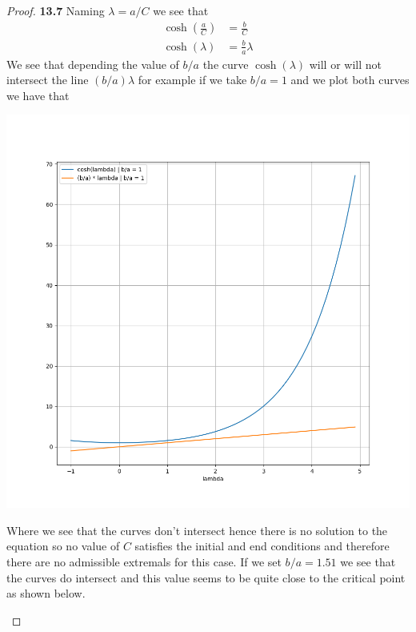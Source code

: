 \documentclass[11pt]{article}
\theoremstyle{definition}
\begin{document}
\begin{proof}{\textbf{13.7}}
    Naming $\lambda = a/C$ we see that
    \begin{align*}
        \cosh\left(\frac{a}{C}\right) &= \frac{b}{C}\\
        \cosh(\lambda) &= \frac{b}{a} \lambda
    \end{align*}
    We see that depending the value of $b/a$ the curve $\cosh(\lambda)$ will or
    will not intersect the line $(b/a) \lambda$ for example if we take
    $b/a = 1$ and we plot both curves we have that
    \begin{center}
        \includegraphics[scale=0.4]{ch13-7_1.png}
    \end{center}
    Where we see that the curves don't intersect hence there is no solution
    to the equation so no value of $C$ satisfies the initial and
    end conditions and therefore there are no admissible extremals
    for this case.
    If we set $b/a = 1.51$ we see that the curves do intersect and this value
    seems to be quite close to the critical point as shown below.
    \begin{center}

\end{center}
\end{proof}
\end{document}
